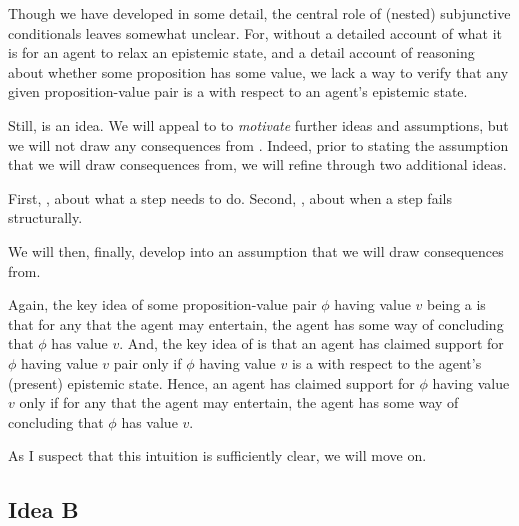 \begin{note}
  Though we have developed \ideaCSA{} in some detail, the central role of (nested) subjunctive conditionals leaves \ideaCSA{} somewhat unclear.
  For, without a detailed account of what it is for an agent to relax an epistemic state, and a detail account of reasoning about whether some proposition has some value, we lack a way to verify that any given proposition-value pair is a \sink{} with respect to an agent's epistemic state.

  Still, \ideaCSA{} is an idea.
  We will appeal to \ideaCSA{} to \emph{motivate} further ideas and assumptions, but we will not draw any consequences from \ideaCSA{}.
  Indeed, prior to stating the assumption that we will draw consequences from, we will refine \ideaCSA{} through two additional ideas.

  First, \ideaCSB{}, about what a step needs to do.
  Second, \ideaCSC{}, about when a step fails structurally.

  We will then, finally, develop \ideaCSC{} into an assumption that we will draw consequences from.
\end{note}

\begin{note}
  Again, the key idea of some proposition-value pair \(\phi\) having value \(v\) being a \sink{} is that for any \epN{} \world{} that the agent may entertain, the agent has some way of concluding that \(\phi\) has value \(v\).
  And, the key idea of \ideaCSA{} is that an agent has claimed support for \(\phi\) having value \(v\) pair only if \(\phi\) having value \(v\) is a \sink{} with respect to the agent's (present) epistemic state.
  Hence, an agent has claimed support for \(\phi\) having value \(v\) only if for any \epN{} \world{} that the agent may entertain, the agent has some way of concluding that \(\phi\) has value \(v\).
\end{note}

\begin{note}
  As I suspect that this intuition is sufficiently clear, we will move on.
\end{note}

\subsection{Idea B}
\label{sec:idea-2}

